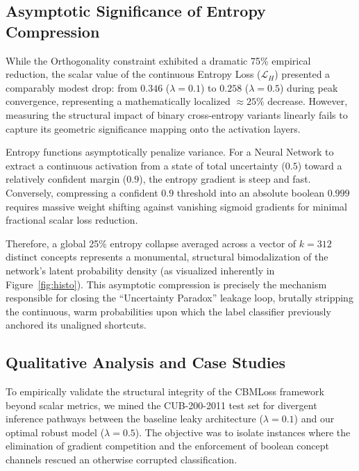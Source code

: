 \documentclass[times,twocolumn,final]{elsarticle}
\begin{document}
\subsection{Asymptotic Significance of Entropy Compression}
While the Orthogonality constraint exhibited a dramatic 75\% empirical reduction, the scalar value of the continuous Entropy Loss ($\mathcal{L}_H$) presented a comparably modest drop: from $0.346$ ($\lambda = 0.1$) to $0.258$ ($\lambda = 0.5$) during peak convergence, representing a mathematically localized $\approx 25\%$ decrease. However, measuring the structural impact of binary cross-entropy variants linearly fails to capture its geometric significance mapping onto the activation layers.

Entropy functions asymptotically penalize variance. For a Neural Network to extract a continuous activation from a state of total uncertainty ($0.5$) toward a relatively confident margin ($0.9$), the entropy gradient is steep and fast. Conversely, compressing a confident $0.9$ threshold into an absolute boolean $0.999$ requires massive weight shifting against vanishing sigmoid gradients for minimal fractional scalar loss reduction. 

Therefore, a global 25\% entropy collapse averaged across a vector of $k=312$ distinct concepts represents a monumental, structural bimodalization of the network's latent probability density (as visualized inherently in Figure~\ref{fig:histo}). This asymptotic compression is precisely the mechanism responsible for closing the ``Uncertainty Paradox'' leakage loop, brutally stripping the continuous, warm probabilities upon which the label classifier previously anchored its unaligned shortcuts.

\subsection{Qualitative Analysis and Case Studies}
To empirically validate the structural integrity of the CBMLoss framework beyond scalar metrics, we mined the CUB-200-2011 test set for divergent inference pathways between the baseline leaky architecture ($\lambda=0.1$) and our optimal robust model ($\lambda=0.5$). The objective was to isolate instances where the elimination of gradient competition and the enforcement of boolean concept channels rescued an otherwise corrupted classification.
\end{document}
